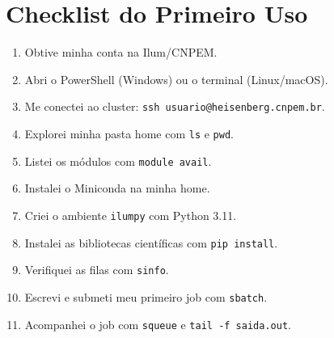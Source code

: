 \documentclass[11pt, a4paper]{article}
\newcommand{\cmd}[1]{\texttt{\textcolor{codeblue}{#1}}}
\begin{document}
\section{Checklist do Primeiro Uso}

\begin{enumerate}
  \item[\(\square\)] Obtive minha conta na Ilum/CNPEM.
  \item[\(\square\)] Abri o PowerShell (Windows) ou o terminal (Linux/macOS).
  \item[\(\square\)] Me conectei ao cluster: \texttt{ssh usuario@heisenberg.cnpem.br}.
  \item[\(\square\)] Explorei minha pasta home com \cmd{ls} e \cmd{pwd}.
  \item[\(\square\)] Listei os módulos com \cmd{module avail}.
  \item[\(\square\)] Instalei o Miniconda na minha home.
  \item[\(\square\)] Criei o ambiente \texttt{ilumpy} com Python 3.11.
  \item[\(\square\)] Instalei as bibliotecas científicas com \cmd{pip install}.
  \item[\(\square\)] Verifiquei as filas com \cmd{sinfo}.
  \item[\(\square\)] Escrevi e submeti meu primeiro job com \cmd{sbatch}.
  \item[\(\square\)] Acompanhei o job com \cmd{squeue} e \cmd{tail -f saida.out}.
\end{enumerate}
\end{document}
